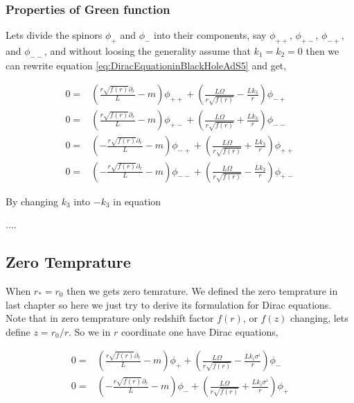 \subsubsection{Properties of Green function}  

Lets divide the spinors $\phi_{+}$ and $\phi_{-}$ into their components, say $\phi_{++}$, $\phi_{+-}$, $\phi_{-+}$, and $\phi_{--}$, and without loosing the generality assume that $k_1=k_2=0$ then we can rewrite equation \ref{eq:DiracEquationinBlackHoleAdS5} and get,

\begin{align} \label{eq:DiracEquationinBlackHoleAdS5I}
    0 =& \left( \frac{r\sqrt{f(r)}\partial_r}{L} - m \right) \phi_{++} + \left( \frac{L\Omega}{r\sqrt{f(r)}} - \frac{Lk_3}{r} \right) \phi_{-+} \nonumber\\
    0 =& \left( \frac{r\sqrt{f(r)}\partial_r}{L} - m \right) \phi_{+-} + \left( \frac{L\Omega}{r\sqrt{f(r)}} + \frac{Lk_3}{r} \right) \phi_{--} \nonumber\\
    0 =& \left(-\frac{r\sqrt{f(r)}\partial_r}{L} - m \right) \phi_{-+} + \left( \frac{L\Omega}{r\sqrt{f(r)}} + \frac{Lk_3}{r} \right) \phi_{++} \nonumber\\
    0 =& \left(-\frac{r\sqrt{f(r)}\partial_r}{L} - m \right) \phi_{--} + \left( \frac{L\Omega}{r\sqrt{f(r)}} - \frac{Lk_3}{r} \right) \phi_{+-}
\end{align}
 
By changing $k_3$ into $-k_3$ in equation  

....

\subsection{Zero Temprature}

When $r_* = r_0$ then we gets zero temrature. We defined the zero temprature in last chapter so here we just try to derive its formulation for Dirac equations. Note that in zero temprature only redshift factor $f(r)$, or $f(z)$ changing, lets define $z=r_0/r$. So we in $r$ coordinate one have Dirac equations,

\begin{align} 
    0 =& \left( \frac{r\sqrt{f(r)}\partial_r}{L} - m \right) \phi_{+} + \left( \frac{L\Omega}{r\sqrt{f(r)}} - \frac{Lk_i\sigma^i}{r} \right) \phi_{-} \nonumber\\
    0 =& \left(-\frac{r\sqrt{f(r)}\partial_r}{L} - m \right) \phi_{-} + \left( \frac{L\Omega}{r\sqrt{f(r)}} + \frac{Lk_i\sigma^i}{r} \right) \phi_{+}
\end{align}

